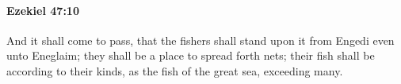 
		\paragraph{Ezekiel 47:10} %
			\label{EZEKIEL-47-10}

			And it shall come to pass, that the fishers shall stand upon it from Engedi even unto Eneglaim; they shall be a place to spread forth nets; their fish shall be according to their kinds, as the fish of the great sea, exceeding many.


